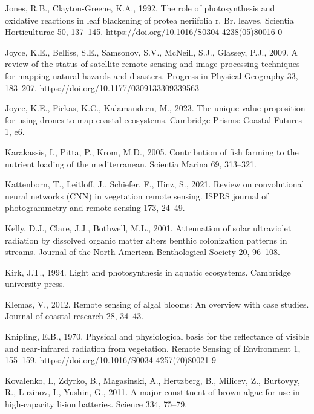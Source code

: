 \documentclass[
  letterpaper,
  11pt,
  english,
  singlespacing,
  headsepline]{MastersDoctoralThesis}
\newlength{\cslhangindent}
\newenvironment{CSLReferences}[2] %
 {\begin{list}{}{%
  \setlength{\itemindent}{0pt}
  \setlength{\leftmargin}{0pt}
  \setlength{\parsep}{0pt}
  \ifodd #1
   \setlength{\leftmargin}{\cslhangindent}
   \setlength{\itemindent}{-1\cslhangindent}
  \fi
  \setlength{\itemsep}{#2\baselineskip}}}
 {\end{list}}
\begin{document}
\begin{CSLReferences}{1}{0}
Jones, R.B., Clayton-Greene, K.A., 1992. The role of photosynthesis and
oxidative reactions in leaf blackening of protea neriifolia r. Br.
leaves. Scientia Horticulturae 50, 137--145.
\url{https://doi.org/10.1016/S0304-4238(05)80016-0}

Joyce, K.E., Belliss, S.E., Samsonov, S.V., McNeill, S.J., Glassey,
P.J., 2009. {A review of the status of satellite remote sensing and
image processing techniques for mapping natural hazards and disasters}.
Progress in Physical Geography 33, 183--207.
\url{https://doi.org/10.1177/0309133309339563}

Joyce, K.E., Fickas, K.C., Kalamandeen, M., 2023. The unique value
proposition for using drones to map coastal ecosystems. Cambridge
Prisms: Coastal Futures 1, e6.

Karakassis, I., Pitta, P., Krom, M.D., 2005. Contribution of fish
farming to the nutrient loading of the mediterranean. Scientia Marina
69, 313--321.

Kattenborn, T., Leitloff, J., Schiefer, F., Hinz, S., 2021. Review on
convolutional neural networks (CNN) in vegetation remote sensing. ISPRS
journal of photogrammetry and remote sensing 173, 24--49.

Kelly, D.J., Clare, J.J., Bothwell, M.L., 2001. Attenuation of solar
ultraviolet radiation by dissolved organic matter alters benthic
colonization patterns in streams. Journal of the North American
Benthological Society 20, 96--108.

Kirk, J.T., 1994. Light and photosynthesis in aquatic ecosystems.
Cambridge university press.

Klemas, V., 2012. Remote sensing of algal blooms: An overview with case
studies. Journal of coastal research 28, 34--43.

Knipling, E.B., 1970. Physical and physiological basis for the
reflectance of visible and near-infrared radiation from vegetation.
Remote Sensing of Environment 1, 155--159.
\url{https://doi.org/10.1016/S0034-4257(70)80021-9}

Kovalenko, I., Zdyrko, B., Magasinski, A., Hertzberg, B., Milicev, Z.,
Burtovyy, R., Luzinov, I., Yushin, G., 2011. A major constituent of
brown algae for use in high-capacity li-ion batteries. Science 334,
75--79.


\end{CSLReferences}
\end{document}
